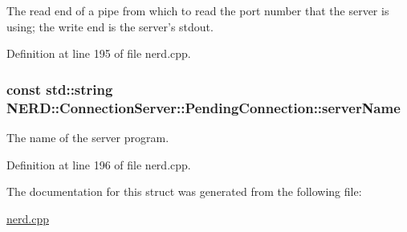 \-The read end of a pipe from which to read the port number that the server is using; the write end is the server's stdout. 



\-Definition at line 195 of file nerd.\-cpp.

\hypertarget{structNERD_1_1ConnectionServer_1_1PendingConnection_aa6bf63096cc00bffa641e31867cec98d}{
\subsubsection[{server\-Name}]{\setlength{\rightskip}{0pt plus 5cm}const std\-::string {\bf \-N\-E\-R\-D\-::\-Connection\-Server\-::\-Pending\-Connection\-::server\-Name}}}
\label{structNERD_1_1ConnectionServer_1_1PendingConnection_aa6bf63096cc00bffa641e31867cec98d}


\-The name of the server program. 



\-Definition at line 196 of file nerd.\-cpp.



\-The documentation for this struct was generated from the following file\-:\begin{DoxyCompactItemize}
\item 
\hyperlink{nerd_8cpp}{nerd.\-cpp}\end{DoxyCompactItemize}
